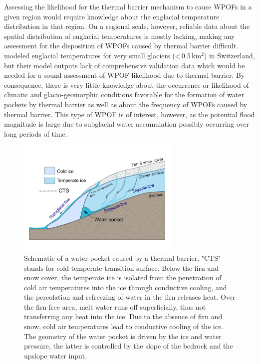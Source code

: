 Assessing the likelihood for the thermal barrier mechanism to cause WPOFs in a given region would require knowledge about the englacial temperature distribution in that region. On a regional scale, however, reliable data about the spatial distribution of englacial temperatures is mostly lacking, making any assessment for the disposition of WPOFs caused by thermal barrier difficult. \cite{Huss&Fischer2016} modeled englacial temperatures for very small glaciers (<\,0.5\,km$^2$) in Switzerland, but their model outputs lack of comprehensive validation data which would be needed for a sound assessment of WPOF likelihood due to thermal barrier. By consequence, there is very little knowledge about the occurrence or likelihood of climatic and glacio-geomorphic conditions favorable for the formation of water pockets by thermal barrier as well as about the frequency of WPOFs caused by thermal barrier. This type of WPOF is of interest, however, as the potential flood magnitude is large due to subglacial water accumulation possibly occurring over long periods of time.


\begin{figure}
    \centering
    \includegraphics[width=0.7\textwidth]{chapters/chapter_WPOFs/thermal_barrier.pdf}
    \caption{Schematic of a water pocket caused by a thermal barrier. "CTS" stands for cold-temperate transition surface. Below the firn and snow cover, the temperate ice is isolated from the penetration of cold air temperatures into the ice through conductive cooling, and the percolation and refreezing of water in the firn releases heat. Over the firn-free area, melt water runs off superficially, thus not transferring any heat into the ice. Due to the absence of firn and snow, cold air temperatures lead to conductive cooling of the ice. The geometry of the water pocket is driven by the ice and water pressure, the latter is controlled by the slope of the bedrock and the upslope water input.}
    \label{fig:WPthermo}
\end{figure}


